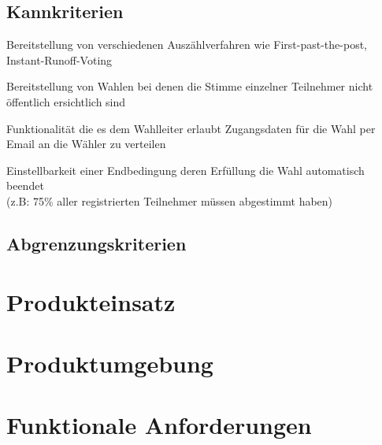 \documentclass[parskip=full,11pt,twoside]{scrartcl}
\begin{document}
\subsection{Kannkriterien}

Bereitstellung von verschiedenen Auszählverfahren wie First-past-the-post, Instant-Runoff-Voting

Bereitstellung von Wahlen bei denen die Stimme einzelner Teilnehmer nicht öffentlich ersichtlich sind

Funktionalität die es dem Wahlleiter erlaubt Zugangsdaten für die Wahl per Email an die Wähler zu verteilen

Einstellbarkeit einer Endbedingung deren Erfüllung die Wahl automatisch beendet \\(z.B: 75\% aller registrierten Teilnehmer müssen abgestimmt haben)

\subsection{Abgrenzungskriterien}

\section{Produkteinsatz}

\section{Produktumgebung}

\section{Funktionale Anforderungen}
\end{document}
